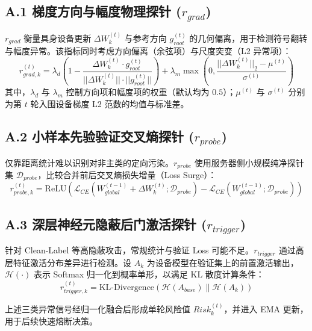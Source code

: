 \documentclass[11pt, a4paper, UTF8, fontset=fandol]{ctexart}
\begin{document}
\subsection{A.1 梯度方向与幅度物理探针 ($r_{grad}$)}
$r_{grad}$ 衡量具身设备更新 $\Delta W_k^{(t)}$ 与参考方向 $g_{root}^{(t)}$ 的几何偏离，用于检测符号翻转与幅度异常。该指标同时考虑方向偏离（余弦项）与尺度突变（L2 异常项）：
\begin{equation}
    r_{grad, k}^{(t)} = \lambda_{d} \left(1 - \frac{\Delta W_k^{(t)} \cdot g_{root}^{(t)}}{||\Delta W_k^{(t)}|| \cdot ||g_{root}^{(t)}||}\right) + \lambda_{m} \max\left(0, \frac{||\Delta W_k^{(t)}||_2 - \mu^{(t)}}{\sigma^{(t)}}\right)
\end{equation}
其中，$\lambda_d$ 与 $\lambda_m$ 控制方向项和幅度项的权重（默认均为 $0.5$）；$\mu^{(t)}$ 与 $\sigma^{(t)}$ 分别为第 $t$ 轮入围设备梯度 L2 范数的均值与标准差。

\subsection{A.2 小样本先验验证交叉熵探针 ($r_{probe}$)}
仅靠距离统计难以识别对非主类的定向污染。$r_{probe}$ 使用服务器侧小规模纯净探针集 $\mathcal{D}_{probe}$，比较合并前后交叉熵损失增量（Loss Surge）：
\begin{equation}
    r_{probe, k}^{(t)} = \text{ReLU}\left( \mathcal{L}_{CE}(W_{global}^{(t-1)} + \Delta W_k^{(t)}; \mathcal{D}_{probe}) - \mathcal{L}_{CE}(W_{global}^{(t-1)}; \mathcal{D}_{probe}) \right)
\end{equation}

\subsection{A.3 深层神经元隐蔽后门激活探针 ($r_{trigger}$)}
针对 Clean-Label 等高隐蔽攻击，常规统计与验证 Loss 可能不足。$r_{trigger}$ 通过高层特征激活分布差异进行检测。设 $A_k$ 为设备模型在验证集上的前置激活输出，$\mathcal{H}(\cdot)$ 表示 Softmax 归一化到概率单形，以满足 KL 散度计算条件：
\begin{equation}
    r_{trigger, k}^{(t)} = \text{KL-Divergence}\left( \mathcal{H}(A_{base}) \| \mathcal{H}(A_k) \right)
\end{equation}

上述三类异常信号经归一化融合后形成单轮风险值 $Risk_{k}^{(t)}$，并进入 EMA 更新，用于后续快速熔断决策。
\end{document}
